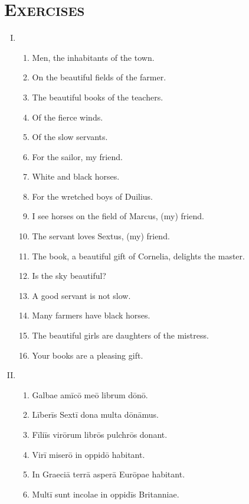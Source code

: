 \documentclass[12pt]{article}
\begin{document}
\section{\textsc{Exercises}}
\begin{enumerate}[I.]
	\setlength{\itemsep}{1em}
	\item \begin{enumerate}[1)]
		\item Men, the inhabitants of the town.
		\item On the beautiful fields of the farmer.
		\item The beautiful books of the teachers.
		\item Of the fierce winds.
		\item Of the slow servants.
		\item For the sailor, my friend.
		\item White and black horses.
		\item For the wretched boys of Duilius.
		\item I see horses on the field of Marcus, (my) friend.
		\item The servant loves Sextus, (my) friend.
		\item The book, a beautiful gift of Cornelia, delights the master.
		\item Is the sky beautiful?
		\item A good servant is not slow.
		\item Many farmers have black horses.
		\item The beautiful girls are daughters of the mistress.
		\item Your books are a pleasing gift.
	\end{enumerate}
	\item \begin{enumerate}[1)]
		\item Galbae amīcō meō librum dōnō.
		\item Līberīs Sextī dona multa dōnāmus.
		\item Fīliīs virōrum librōs pulchrōs donant.
		\item Virī miserō in oppidō habitant.
		\item In Graeciā terrā asperā Eurōpae habitant.
		\item Multī sunt incolae in oppidīs Britanniae.
	\end{enumerate}
\end{enumerate}
\end{document}
